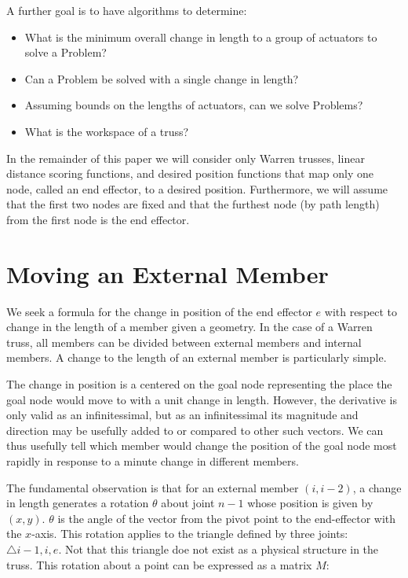 \documentclass[11pt]{article}
\begin{document}
A further goal is to have algorithms to determine:
\begin{itemize}
\item What is the minimum overall change in length to a group of actuators to solve a Problem?
\item Can a Problem be solved with a single change in length?
\item Assuming bounds on the lengths of actuators, can we solve Problems?
  \item What is the workspace of a truss?
  \end{itemize}

In the remainder of this paper we will consider only Warren trusses, linear distance scoring functions, and desired position functions
that map only one node, called an end effector, to a desired position. Furthermore, we will assume that the first two nodes are fixed
and that the furthest node (by path length) from the first node is the end effector.

\section{Moving an External Member}

We seek a formula for the change in position of the end effector $e$ with respect to change in the length of a member given a geometry.
In the case of a Warren truss, all members can be divided between external members and internal members. A change to the length of an
external member is particularly simple.

The change in position is a centered on the goal node representing the place the goal node would move to with a unit change in length.
However, the derivative is only valid as an infinitessimal, but as an infinitessimal its magnitude and direction may be usefully
added to or compared to other such vectors. We can thus usefully tell which member would change the position of the goal node most
rapidly in response to a minute change in different members.

The fundamental observation is that for an external member $(i,i-2)$, a change in length generates a rotation $\theta$ about joint $n-1$
whose position is given by $(x,y)$. $\theta$ is the angle of the vector from the pivot point to the end-effector with the $x$-axis.
This rotation applies to the triangle defined by three joints: $\triangle i-1,i,e$. Not that this triangle doe not exist as a physical
structure in the truss. This rotation about a point can be expressed as a matrix $M$:
\end{document}
